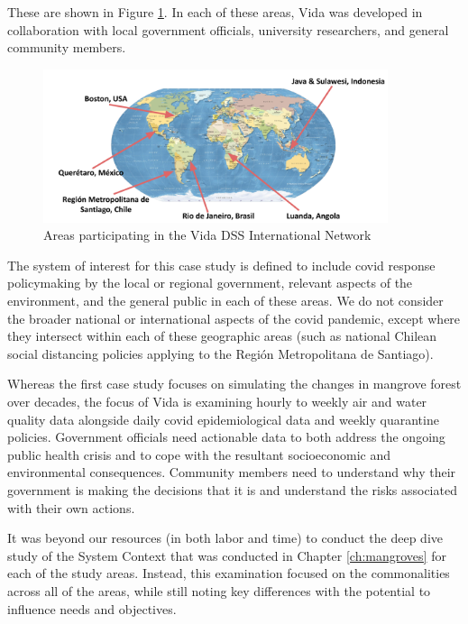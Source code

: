 These are shown in Figure \ref{fig:vida_map}. In each of these areas, Vida was developed in collaboration with local government officials, university researchers, and general community members. 

\begin{figure}[!htb]
	\centering
	\includegraphics[width=0.9\textwidth]{Figures/chap5/vida_map.png}
	\caption{Areas participating in the Vida DSS International Network}
	\label{fig:vida_map}
\end{figure}

The system of interest for this case study is defined to include \ac{covid} response policymaking by the local or regional government, relevant aspects of the environment, and the general public in each of these areas. We do not consider the broader national or international aspects of the \ac{covid} pandemic, except where they intersect within each of these geographic areas (such as national Chilean social distancing policies applying to the Región Metropolitana de Santiago). 

Whereas the first case study focuses on simulating the changes in mangrove forest over decades, the focus of Vida is examining hourly to weekly air and water quality data alongside daily \ac{covid} epidemiological data and weekly quarantine policies. Government officials need actionable data to both address the ongoing public health crisis and to cope with the resultant socioeconomic and environmental consequences. Community members need to understand why their government is making the decisions that it is and understand the risks associated with their own actions.

It was beyond our resources (in both labor and time) to conduct the deep dive study of the System Context that was conducted in Chapter \ref{ch:mangroves} for each of the study areas. Instead, this examination focused on the commonalities across all of the areas, while still noting key differences with the potential to influence needs and objectives. 

